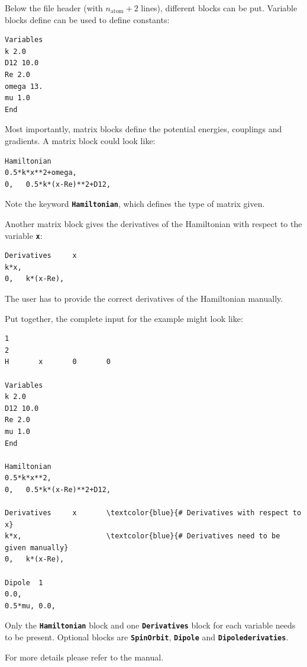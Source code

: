 \documentclass[a4paper,11pt,DIV=15,openany]{scrbook}
\newcommand{\ttt}[1]{\textbf{\texttt{#1}}}
\begin{document}
Below the file header (with $n_\text{atom}+2$ lines), different blocks can be put. Variable blocks define can be used to define constants:
\begin{oframed}
\footnotesize\begin{Verbatim}[commandchars=\\\{\}]
Variables
k 2.0
D12 10.0
Re 2.0
omega 13.
mu 1.0
End
\end{Verbatim}
\end{oframed}

Most importantly, matrix blocks define the potential energies, couplings and gradients. A matrix block could look like:
\begin{oframed}
\footnotesize\begin{Verbatim}[commandchars=\\\{\}]
Hamiltonian
0.5*k*x**2+omega,
0,   0.5*k*(x-Re)**2+D12,
\end{Verbatim}
\end{oframed}
Note the keyword \ttt{Hamiltonian}, which defines the type of matrix given.

Another matrix block gives the derivatives of the Hamiltonian with respect to the variable \ttt{x}:
\begin{oframed}
\footnotesize\begin{Verbatim}[commandchars=\\\{\}]
Derivatives     x
k*x,
0,   k*(x-Re),
\end{Verbatim}
\end{oframed}
The user has to provide the correct derivatives of the Hamiltonian manually.

Put together, the complete input for the example might look like:
\begin{oframed}
\footnotesize\begin{Verbatim}[commandchars=\\\{\}]
1
2
H       x       0       0

Variables
k 2.0
D12 10.0
Re 2.0
mu 1.0
End

Hamiltonian
0.5*k*x**2,
0,   0.5*k*(x-Re)**2+D12,

Derivatives     x       \textcolor{blue}{# Derivatives with respect to x}
k*x,                    \textcolor{blue}{# Derivatives need to be given manually}
0,   k*(x-Re),

Dipole  1
0.0,
0.5*mu, 0.0,

\end{Verbatim}
\end{oframed}

Only the \ttt{Hamiltonian} block and one \ttt{Derivatives} block for each variable needs to be present. Optional blocks are \ttt{SpinOrbit}, \ttt{Dipole} and \ttt{Dipolederivaties}. 

For more details please refer to the manual.
\end{document}
